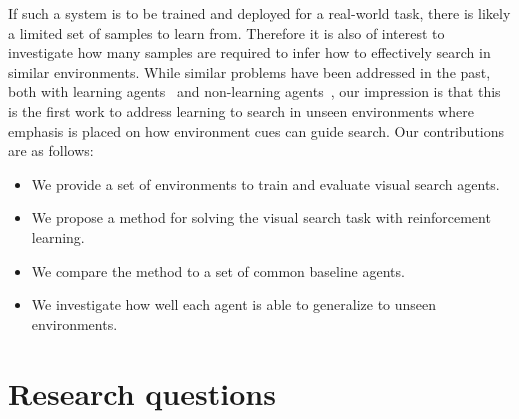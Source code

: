 If such a system is to be trained and deployed for a real-world task, there is likely a limited set of samples to learn from.
Therefore it is also of interest to investigate how many samples are required to infer how to effectively search in similar environments.
While similar problems have been addressed in the past, both with learning agents~\cite{minut_mahadevan_2001,mirowski_navigate_2017,ghesu_artificial_2016,caicedo_active_2015} and non-learning agents~\cite{shubina_visualsearch_2010,forssen_visual_2008}, 
our impression is that this is the first work to address learning to search in unseen environments where emphasis is placed on how environment cues can guide search.
Our contributions are as follows:

\begin{itemize}
  \item We provide a set of environments to train and evaluate visual search agents.
  \item We propose a method for solving the visual search task with reinforcement learning.
  \item We compare the method to a set of common baseline agents.
  \item We investigate how well each agent is able to generalize to unseen environments.
\end{itemize}

\section{Research questions}
\label{sec:research-questions}

